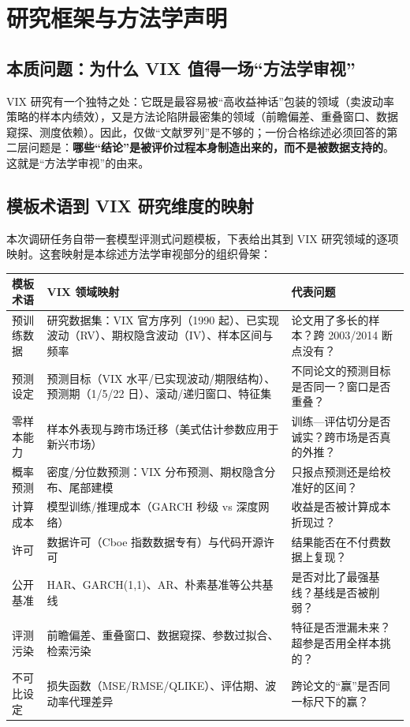\documentclass[11pt,a4paper]{article}
\begin{document}
{
\hypersetup{linkcolor=black}
\tableofcontents
}
\newpage

\section{研究框架与方法学声明}

\subsection{本质问题：为什么 VIX 值得一场“方法学审视”}

VIX 研究有一个独特之处：它既是最容易被“高收益神话”包装的领域（卖波动率策略的样本内绩效），又是方法论陷阱最密集的领域（前瞻偏差、重叠窗口、数据窥探、测度依赖）。因此，仅做“文献罗列”是不够的；一份合格综述必须回答的第二层问题是：\textbf{哪些“结论”是被评价过程本身制造出来的，而不是被数据支持的}。这就是“方法学审视”的由来。

\subsection{模板术语到 VIX 研究维度的映射}

本次调研任务自带一套模型评测式问题模板，下表给出其到 VIX 研究领域的逐项映射。这套映射是本综述方法学审视部分的组织骨架：

\begin{center}
\begin{tabular}{@{}L{0.16\textwidth}L{0.42\textwidth}L{0.40\textwidth}@{}}
\toprule
\textbf{模板术语} & \textbf{VIX 领域映射} & \textbf{代表问题} \\
\midrule
预训练数据 & 研究数据集：VIX 官方序列（1990 起）、已实现波动（RV）、期权隐含波动（IV）、样本区间与频率 & 论文用了多长的样本？跨 2003/2014 断点没有？ \\
预测设定 & 预测目标（VIX 水平/已实现波动/期限结构）、预测期（1/5/22 日）、滚动/递归窗口、特征集 & 不同论文的预测目标是否同一？窗口是否重叠？ \\
零样本能力 & 样本外表现与跨市场迁移（美式估计参数应用于新兴市场） & 训练—评估切分是否诚实？跨市场是否真的外推？ \\
概率预测 & 密度/分位数预测：VIX 分布预测、期权隐含分布、尾部建模 & 只报点预测还是给校准好的区间？ \\
计算成本 & 模型训练/推理成本（GARCH 秒级 vs 深度网络） & 收益是否被计算成本折现过？ \\
许可 & 数据许可（Cboe 指数数据专有）与代码开源许可 & 结果能否在不付费数据上复现？ \\
公开基准 & HAR、GARCH(1,1)、AR、朴素基准等公共基线 & 是否对比了最强基线？基线是否被削弱？ \\
评测污染 & 前瞻偏差、重叠窗口、数据窥探、参数过拟合、检索污染 & 特征是否泄漏未来？超参是否用全样本挑的？ \\
不可比设定 & 损失函数（MSE/RMSE/QLIKE）、评估期、波动率代理差异 & 跨论文的“赢”是否同一标尺下的赢？ \\
\bottomrule
\end{tabular}
\end{center}
\end{document}
